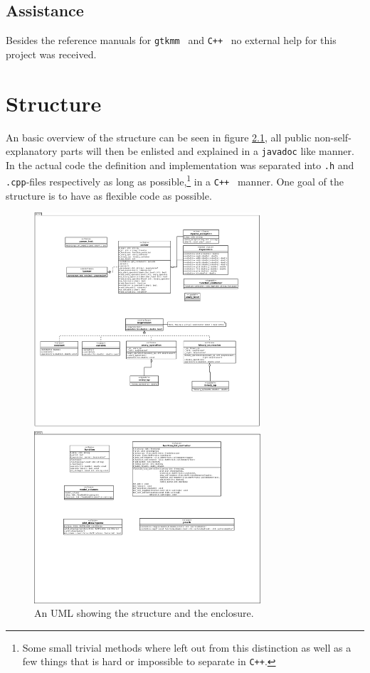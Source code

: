 \documentclass[a4paper,11pt]{kth-mag}
\newcommand{\Cpp}{\texttt{C++}}
\newcommand{\Gtkmm}{\texttt{gtkmm}}
\begin{document}
\section{Assistance}
Besides the reference manuals for \Gtkmm~ and \Cpp~ no external help for 
this project was received.

\chapter{Structure}
An basic overview of the structure can be seen in figure \ref{fig:UML}, all
public non-self-explanatory parts will then be enlisted and explained in 
a \verb+javadoc+ like manner. In the actual code the definition and
implementation was separated into \texttt{.h} and \texttt{.cpp}-files
respectively as long as possible,\footnote{Some small trivial methods where
left out from this distinction as well as a few things that is hard or
impossible to separate in \Cpp.} in a \Cpp~ manner. One goal of the structure
is to have as flexible code as possible.
\begin{figure}[ht]
\begin{center}
    \includegraphics[width=0.75\textwidth]{uml.pdf}
    \caption{\small{An UML showing the structure and the enclosure.}}\label{fig:UML}
\end{center}
\end{figure}
\end{document}

